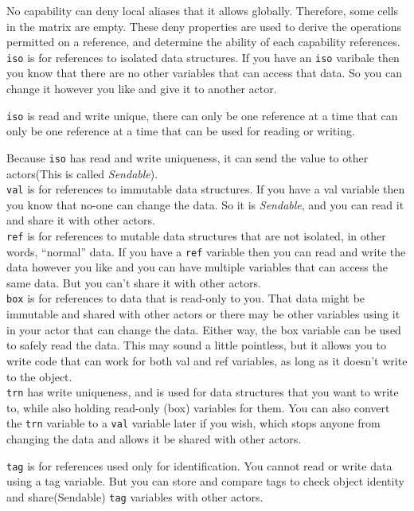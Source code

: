 \documentclass{article}
\begin{document}
No capability can deny local aliases that it allows globally.  Therefore, some cells in the matrix are empty.
These deny properties are used to derive the operations permitted on a reference, and determine the ability of each capability references. \\

\texttt{iso} is for references to isolated data structures. If you have an \texttt{iso} varibale then you know that there are no other variables that can access that data. So you can change it however you like and give it to another actor. 

\texttt{iso} is read and write unique, there can only be one reference at a time that can only be one reference at a time that can be used for reading or writing.

Because \texttt{iso} has read and write uniqueness, it can send the value to other actors(This is called \textit{Sendable}).\\

\texttt{val} is for references to immutable data structures. If you have a val variable then you know that no-one can change the data. So it is \textit{Sendable}, and you can read it and share it with other actors.\\


\texttt{ref}  is for references to mutable data structures that are not isolated, in other words, “normal” data. If you have a \texttt{ref} variable then you can read and write the data however you like and you can have multiple variables that can access the same data. But you can’t share it with other actors.\\

\texttt{box} is for references to data that is read-only to you. That data might be immutable and shared with other actors or there may be other variables using it in your actor that can change the data. Either way, the box variable can be used to safely read the data. This may sound a little pointless, but it allows you to write code that can work for both val and ref variables, as long as it doesn’t write to the object.\\

\texttt{trn} has write uniqueness, and is used for data structures that you want to write to, while also holding read-only (box) variables for them. You can also convert the \texttt{trn} variable to a \texttt{val} variable later if you wish, which stops anyone from changing the data and allows it be shared with other actors.

\texttt{tag} is for references used only for identification. You cannot read or write data using a tag variable. But you can store and compare tags to check object identity and share(Sendable) \texttt{tag} variables with other actors.
\end{document}
